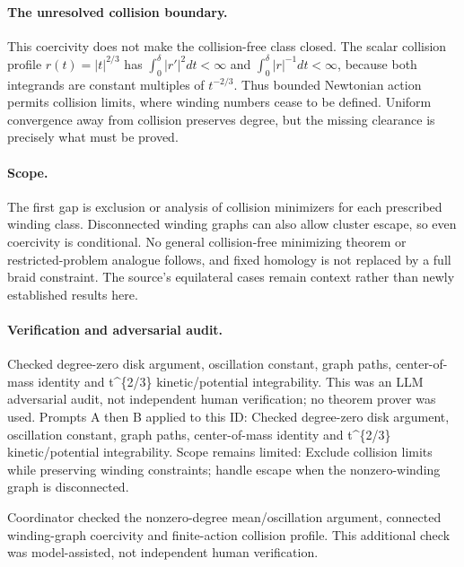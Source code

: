 \documentclass[11pt]{article}
\begin{document}
\paragraph{The unresolved collision boundary.}This coercivity does not make the collision-free class closed. The scalar collision profile \(r(t)=|t|^{2/3}\) has \(\int_0^\delta|r'|^2dt<\infty\) and \(\int_0^\delta|r|^{-1}dt<\infty\), because both integrands are constant multiples of \(t^{-2/3}\). Thus bounded Newtonian action permits collision limits, where winding numbers cease to be defined. Uniform convergence away from collision preserves degree, but the missing clearance is precisely what must be proved.
\paragraph{Scope.}The first gap is exclusion or analysis of collision minimizers for each prescribed winding class. Disconnected winding graphs can also allow cluster escape, so even coercivity is conditional. No general collision-free minimizing theorem or restricted-problem analogue follows, and fixed homology is not replaced by a full braid constraint. The source's equilateral cases remain context rather than newly established results here.

\paragraph{Verification and adversarial audit.}
Checked degree-zero disk argument, oscillation constant, graph paths, center-of-mass identity and t\textasciicircum{}\{2/3\} kinetic/potential integrability. This was an LLM adversarial audit, not independent human verification; no theorem prover was used. Prompts A then B applied to this ID: Checked degree-zero disk argument, oscillation constant, graph paths, center-of-mass identity and t\textasciicircum{}\{2/3\} kinetic/potential integrability. Scope remains limited: Exclude collision limits while preserving winding constraints; handle escape when the nonzero-winding graph is disconnected.

Coordinator checked the nonzero-degree mean/oscillation argument, connected winding-graph coercivity and finite-action collision profile. This additional check was model-assisted, not independent human verification.
\end{document}
